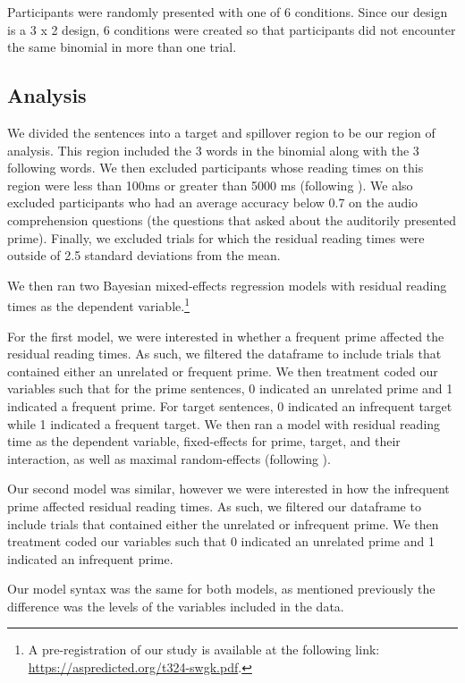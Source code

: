 \documentclass[
  12pt,
]{scrartcl}
\begin{document}
Participants were randomly presented with one of 6 conditions. Since our
design is a 3 x 2 design, 6 conditions were created so that participants
did not encounter the same binomial in more than one trial.

\subsection{Analysis}\label{analysis}

We divided the sentences into a target and spillover region to be our
region of analysis. This region included the 3 words in the binomial
along with the 3 following words. We then excluded participants whose
reading times on this region were less than 100ms or greater than 5000
ms (following ). We also excluded participants who had an average accuracy
below 0.7 on the audio comprehension questions (the questions that asked
about the auditorily presented prime). Finally, we excluded trials for
which the residual reading times were outside of 2.5 standard deviations
from the mean.

We then ran two Bayesian mixed-effects regression models with residual
reading times as the dependent variable.\footnote{A pre-registration of
  our study is available at the following link:
  \url{https://aspredicted.org/t324-swgk.pdf}.}

For the first model, we were interested in whether a frequent prime
affected the residual reading times. As such, we filtered the dataframe
to include trials that contained either an unrelated or frequent prime.
We then treatment coded our variables such that for the prime sentences,
0 indicated an unrelated prime and 1 indicated a frequent prime. For
target sentences, 0 indicated an infrequent target while 1 indicated a
frequent target. We then ran a model with residual reading time as the
dependent variable, fixed-effects for prime, target, and their
interaction, as well as maximal random-effects (following
).

Our second model was similar, however we were interested in how the
infrequent prime affected residual reading times. As such, we filtered
our dataframe to include trials that contained either the unrelated or
infrequent prime. We then treatment coded our variables such that 0
indicated an unrelated prime and 1 indicated an infrequent prime.

Our model syntax was the same for both models, as mentioned previously
the difference was the levels of the variables included in the data.
\end{document}
